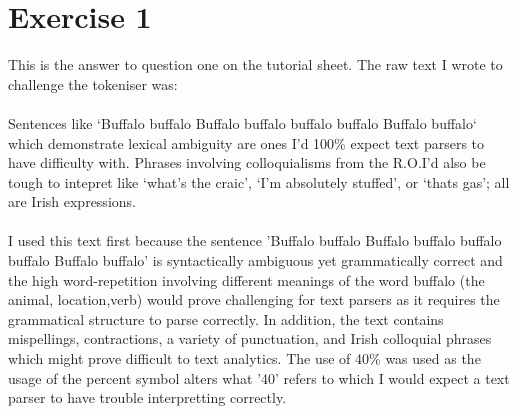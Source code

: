 \documentclass{scrreprt}
\begin{document}
\section{Exercise 1}
This is the answer to question one on the tutorial sheet. The raw text I wrote to challenge the tokeniser was:\\
\\
Sentences like ‘Buffalo buffalo Buffalo buffalo buffalo buffalo Buffalo buffalo‘ which demonstrate lexical ambiguity are ones I’d 100\% expect text parsers to have difficulty with. Phrases involving colloquialisms from the R.O.I’d also be tough to intepret like ‘what’s the craic’, ‘I’m absolutely stuffed’, or ‘thats gas’; all are Irish expressions.\\
\\
I used this text first because the sentence 'Buffalo buffalo Buffalo buffalo buffalo buffalo Buffalo buffalo' is syntactically ambiguous yet grammatically correct and the high word-repetition involving different meanings of the word buffalo (the animal, location,verb) would prove challenging for text parsers as it requires the grammatical structure to parse correctly. In addition, the text contains mispellings, contractions, a variety of punctuation, and Irish colloquial phrases which might prove difficult to text analytics. The use of 40\% was used as the usage of the percent symbol alters what '40' refers to which I would expect a text parser to have trouble interpretting correctly.
\end{document}
